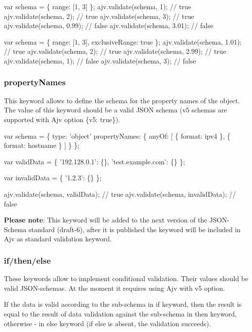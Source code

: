 \begin{DoxyCode}
var schema = \{ range: [1, 3] \};
ajv.validate(schema, 1); // true
ajv.validate(schema, 2); // true
ajv.validate(schema, 3); // true
ajv.validate(schema, 0.99); // false
ajv.validate(schema, 3.01); // false

var schema = \{ range: [1, 3], exclusiveRange: true \};
ajv.validate(schema, 1.01); // true
ajv.validate(schema, 2); // true
ajv.validate(schema, 2.99); // true
ajv.validate(schema, 1); // false
ajv.validate(schema, 3); // false
\end{DoxyCode}


\subsubsection*{{\ttfamily property\+Names}}

This keyword allows to define the schema for the property names of the object. The value of this keyword should be a valid J\+S\+ON schema (v5 schemas are supported with Ajv option {\ttfamily \{v5\+: true\}}).


\begin{DoxyCode}
var schema = \{
  type: 'object'
  propertyNames: \{
    anyOf: [
      \{ format: ipv4 \},
      \{ format: hostname \}
    ]
  \}
\};

var validData = \{
  '192.128.0.1': \{\},
  'test.example.com': \{\}
\};

var invalidData = \{
  '1.2.3': \{\}
\};

ajv.validate(schema, validData); // true
ajv.validate(schema, invalidData); // false
\end{DoxyCode}


{\bfseries Please note}\+: This keyword will be added to the next version of the J\+S\+O\+N-\/\+Schema standard (draft-\/6), after it is published the keyword will be included in Ajv as standard validation keyword.

\subsubsection*{{\ttfamily if}/{\ttfamily then}/{\ttfamily else}}

These keywords allow to implement conditional validation. Their values should be valid J\+S\+O\+N-\/schemas. At the moment it requires using Ajv with v5 option.

If the data is valid according to the sub-\/schema in {\ttfamily if} keyword, then the result is equal to the result of data validation against the sub-\/schema in {\ttfamily then} keyword, otherwise -\/ in {\ttfamily else} keyword (if {\ttfamily else} is absent, the validation succeeds).


